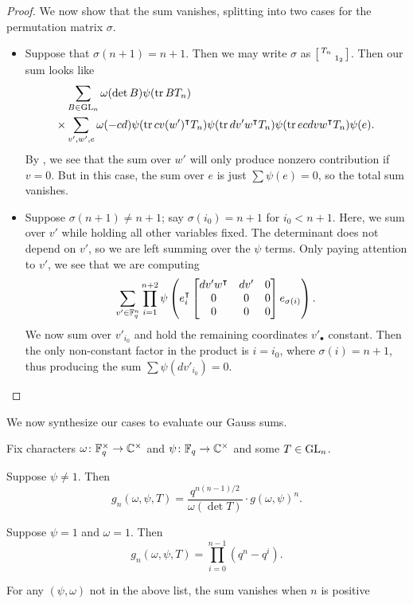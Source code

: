 \begin{proof}
    We now show that the sum vanishes, splitting into two cases for the permutation matrix $\sigma$.
    \begin{itemize}
        \item Suppose that $\sigma(n+1)=n+1$. Then we may write $\sigma$ as $\begin{bsmallmatrix}
            T_n \\ & 1_2
        \end{bsmallmatrix}$. Then our sum looks like
        \begin{align*}
            & \sum_{B\in\mathrm{GL}_n}\omega(\det B)\psi(\operatorname{tr} BT_n) \\
            \times{}& \sum_{v',w',e}\omega(-cd)\psi(\operatorname{tr} cv(w')^\intercal T_n)\psi(\operatorname{tr} dv'w^\intercal T_n)\psi(\operatorname{tr} ecdvw^\intercal T_n)\psi(e).
        \end{align*}
        By , we see that the sum over $w'$ will only produce nonzero contribution if $v=0$. But in this case, the sum over $e$ is just $\sum\psi(e)=0$, so the total sum vanishes.
        
        \item Suppose $\sigma(n+1)\ne n+1$; say $\sigma(i_0)=n+1$ for $i_0<n+1$. Here, we sum over $v'$ while holding all other variables fixed. The determinant does not depend on $v'$, so we are left summing over the $\psi$ terms. Only paying attention to $v'$, we see that we are computing
        \[\sum_{v'\in\mathbb F_q^n}\prod_{i=1}^{n+2}\psi\left(e_i^\intercal \begin{bmatrix}
            dv'w^\intercal & dv' & 0 \\
            0 & 0 & 0 \\
            0 & 0 & 0
        \end{bmatrix}e_{\sigma(i)}\right).\]
        We now sum over $v'_{i_0}$ and hold the remaining coordinates $v'_\bullet$ constant. Then the only non-constant factor in the product is $i=i_0$, where $\sigma(i)=n+1$, thus producing the sum $\sum\psi(dv'_{i_0})=0$.
        \qedhere
    \end{itemize}
\end{proof}
We now synthesize our cases to evaluate our Gauss sums.
\begin{theorem} \label{thm:gsum-gl}
    Fix characters $\omega\colon\mathbb F_q^\times\to\mathbb C^\times$ and $\psi\colon\mathbb F_q\to\mathbb C^\times$ and some $T\in\mathrm{GL}_n$.
    \begin{listalph}
        \item Suppose $\psi\ne1$. Then
        \[g_n(\omega,\psi,T)=\frac{q^{n(n-1)/2}}{\omega(\det T)}\cdot g(\omega,\psi)^n.\]
        \item Suppose $\psi=1$ and $\omega=1$. Then
        \[g_n(\omega,\psi,T)=\prod_{i=0}^{n-1}\left(q^n-q^i\right).\]
    \end{listalph}For any $(\psi,\omega)$ not in the above list, the sum vanishes when $n$ is positive
\end{theorem}
